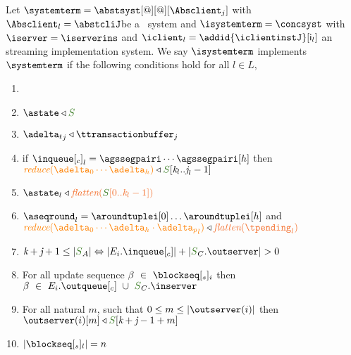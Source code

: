 \begin{definition} \label{def:implementation}
Let  $\systemterm = \abstsyst[@][@][\Absclient_j]$ with $\Absclient_l={\abstcliJ}$be a \tgspcalculus\ system and 
$\isystemterm = \concsyst $  with $\iserver = \iserverins$ and $\iclient_l = \addid{\iclientinstJ}[{\cid{_l}}]$ 
an streaming implementation
system. We say $\isystemterm$ implements $\systemterm$ if the following conditions hold for all $l \in L$,

\begin{enumerate}
	\item {}
	\item $\astate \triangleleft \queuemessage$
	\item \label{prop_transactions} ${\transactionbuffer}_j\triangleleft{\ttransactionbuffer}_j$ 
	\item {}	\label{prop_inclient}
	if ${\inclient}_l = \agssegpairi \cdots \agssegpairi[h]$ then $\ireduce{\adelta_0\cdots\adelta_h}\triangleleft  \queuemessage[\tknown_l..\treceivebuffer_l-1]$
	
	\item \label{prop_state_known} $\astate_l \triangleleft \flatten {\queuemessage[0 .. \tknown_l - 1]}$
	\item \label{prop_pending} $\pending_l = \aroundtuplei[0]\ldots\aroundtuplei[h]$ and $\ireduce{\adelta_0\cdots\adelta_h\cdot {\pushbuffer}_l} \triangleleft \flatten{\tpending_l}$
	\item $\tknown + \treceivebuffer + 1 \leq |\queuemessage_A| \Leftrightarrow |E_{i}.\inclient| + |\queuemessage_C.\outserver| > 0$
	\item For all update sequence $\beta \ \in \ \tsent_i$ then $\beta \ \in \ E_{i}.\outclient \ \cup \ \queuemessage_C.\inserver$
	\item \label{prop_outserver} For all natural $m$, such that $0 \leq m \leq |\outserver(i)|$ then $\outserver(i)[m] \triangleleft \queuemessage[\tknown + \treceivebuffer - 1 + m]$
\item \label{prop_size_buffersent} $|\tsent_l| = n$ 
	


\end{enumerate}
\end{definition}
